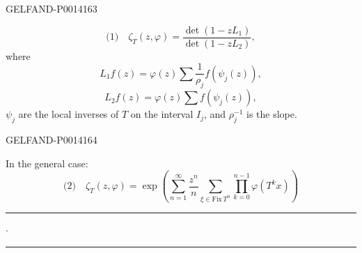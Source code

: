 \begin{GelfandAdjacentEvidence}{GELFAND-P001416}{3}


\[
\text{(1)}\quad \zeta_T(z,\varphi)=\frac{\det(1-zL_1)}{\det(1-zL_2)},
\]
where
\[
L_1f(z)=\varphi(z)\sum\frac{1}{\rho_j}f(\psi_j(z)),
\]
\[
L_2f(z)=\varphi(z)\sum f(\psi_j(z)),
\]
\(\psi_j\) are the local inverses of \(T\) on the interval \(I_j\), and \(\rho_j^{-1}\) is the slope.
\end{GelfandAdjacentEvidence}
\begin{GelfandAdjacentEvidence}{GELFAND-P001416}{4}


In the general case:
\[
\text{(2)}\quad
\zeta_T(z,\varphi)=\exp\left(
\sum_{n=1}^{\infty}\frac{z^n}{n}
\sum_{\xi\in\mathrm{Fix}\,T^n}
\prod_{k=0}^{n-1}\varphi(T^k x)\right)
\]
\end{GelfandAdjacentEvidence}


\begin{center}
\rule{16mm}{.35pt}\enspace\(\cdot\)\enspace\rule{16mm}{.35pt}
\end{center}


